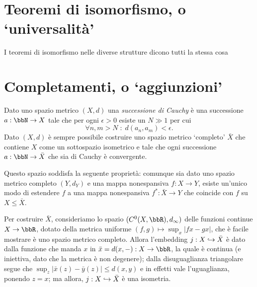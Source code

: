 \section*{Teoremi di isomorfismo, o `universalità'}
I teoremi di isomorfismo nelle diverse strutture dicono tutti la stessa cosa
\section*{Completamenti, o `aggiunzioni'}
Dato uno spazio metrico \((X,d)\) una \emph{successione di Cauchy} è una successione \(a : \bbN \to X\) tale che per ogni \(\epsilon>0\) esiste un \(N\gg 1\) per cui
\[\forall n,m> N\; : \; d(a_n,a_m) < \epsilon.\]
Dato \((X,d)\) è sempre possibile costruire uno spazio metrico `completo' \(\bar X\) che contiene \(X\) come un sottospazio isometrico e tale che ogni successione \(a : \bbN \to \bar X\) che sia di Cauchy è convergente.

Questo spazio soddisfa la seguente proprietà: comunque sia dato uno spazio metrico completo \((Y,d_Y)\) e una mappa nonespansiva \(f : X\to Y\), esiste un'unico modo di estendere \(f\) a una mappa nonespansiva \(f^* : \bar X \to Y\) che coincide con \(f\) su \(X\le \bar X\).

Per costruire \(\bar X\), consideriamo lo spazio \((C^0(X,\bbR),d_\infty)\) delle funzioni continue \(X\to\bbR\), dotato della metrica uniforme \((f,g)\mapsto \sup_x |fx-gx|\), che è facile mostrare è uno spazio metrico completo. Allora l'embedding \(j : X\hookrightarrow \bar X\) è dato dalla funzione che manda \(x\) in \(\bar x = d(x,-) : X\to \bbR\), la quale è continua (e iniettiva, dato che la metrica è non degenere); dalla disuguaglianza triangolare segue che \(\sup_z|\bar{x}(z)-\bar{y}(z)|\le d(x,y)\) e in effetti vale l'uguaglianza, ponendo \(z=x\); ma allora, \(j : X\hookrightarrow \bar X\) è una isometria.

